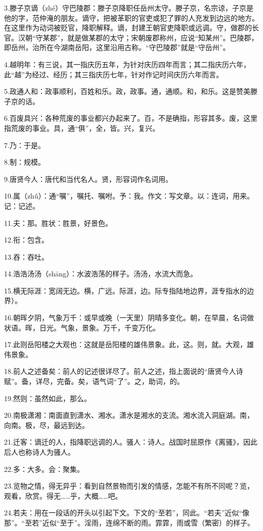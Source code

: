 \documentclass[letterpaper,12pt,english]{sphinxmanual}
\begin{document}
3.滕子京谪（zhé）守巴陵郡：滕子京降职任岳州太守。滕子京，名宗谅，子京是他的字，范仲淹的朋友。谪守，把被革职的官吏或犯了罪的人充发到边远的地方。在这里作为动词被贬官，降职解释。谪，封建王朝官吏降职或远调。守，做郡的长官。汉朝“守某郡”，就是做某郡的太守；宋朝废郡称州，应说“知某州”。巴陵郡，即岳州，治所在今湖南岳阳，这里沿用古称。“守巴陵郡”就是“守岳州”。

4.越明年：有三说，其一指庆历五年，为针对庆历四年而言；其二指庆历六年，此“越”为经过、经历；其三指庆历七年，针对作记时间庆历六年而言。

5.政通人和：政事顺利，百姓和乐。政，政事。通，通顺。和，和乐。这是赞美滕子京的话。

6.百废具兴：各种荒废的事业都兴办起来了。百，不是确指，形容其多。废，这里指荒废的事业。具，通“俱”，全，皆。兴，复兴。

7.乃：于是。

8.制：规模。

9.唐贤今人：唐代和当代名人。贤，形容词作名词用。

10.属（zhǔ）：通“嘱”，嘱托、嘱咐。予：我。作文：写文章。以：连词，用来。记：记述。

11.夫：那。胜状：胜景，好景色。

12.衔：包含。

13.吞：吞吐。

14.浩浩汤汤（shāng）：水波浩荡的样子。汤汤，水流大而急。

15.横无际涯：宽阔无边。横，广远。际涯，边。际专指陆地边界，涯专指水的边界）。

16.朝晖夕阴，气象万千：或早或晚（一天里）阴晴多变化。朝，在早晨，名词做状语。晖，日光。气象，景象。万千，千变万化。

17.此则岳阳楼之大观也：这就是岳阳楼的雄伟景象。此，这。则，就。大观，雄伟景象。

18.前人之述备矣：前人的记述很详尽了。前人之述，指上面说的“唐贤今人诗赋”。备，详尽，完备。矣，语气词“了”。之，助词，的。

19.然则：虽然如此，那么。

20.南极潇湘：南面直到潇水、湘水。潇水是湘水的支流。湘水流入洞庭湖。南，向南。极，尽，最远到达。

21.迁客：谪迁的人，指降职远调的人。骚人：诗人。战国时屈原作《离骚》，因此后人也称诗人为骚人。

22.多：大多。会：聚集。

23.览物之情，得无异乎：看到自然景物而引发的情感，怎能不有所不同呢？览，观看，欣赏。得无……乎，大概……吧。

24.若夫：用在一段话的开头以引起下文。下文的“至若”，同此。“若夫”近似“像那”。“至若”近似“至于”。淫雨，连绵不断的雨。霏霏，雨或雪（繁密）的样子。
\end{document}
